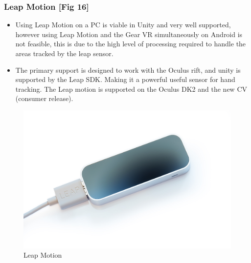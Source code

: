 \documentclass[a4paper,10pt]{article}
\begin{document}
\subsubsection{Leap Motion [Fig 16]}
\begin{itemize}
	\item Using Leap Motion on a PC is viable in Unity and very well supported, however using Leap Motion and the Gear VR simultaneously on Android is not feasible, this is due to the high level of processing required to
	handle the areas tracked by the leap sensor. 
	\item The primary support is designed to work with the Oculus rift, and unity is supported by the Leap SDK. Making it a powerful useful sensor for hand tracking. The 
	Leap motion is supported on the Oculus DK2 and the new CV (consumer release). 
\end{itemize}
\begin{figure}[H]
	\centerline{\includegraphics[scale= 0.13]{leap.jpg}}
	\caption{Leap Motion}
	\label{fig:leapImg}
\end{figure}
\pagebreak	
\end{document}
